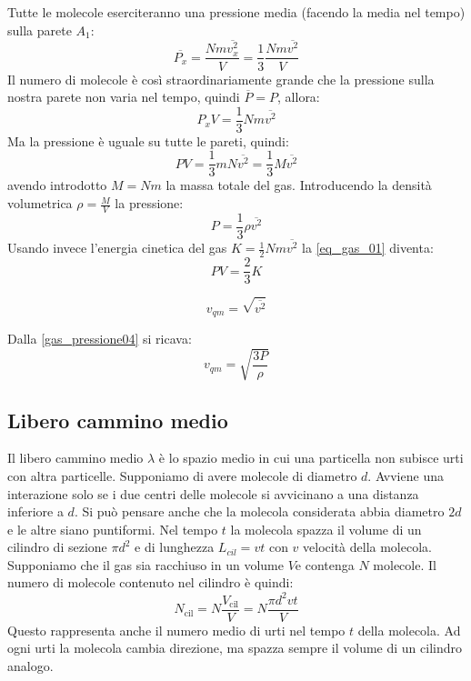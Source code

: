 Tutte le molecole eserciteranno una pressione media (facendo la media nel tempo) sulla parete $A_1$:
\begin{equation}
\overline{P_x}=\frac{Nm\overline{v_x^2}}{V}=\frac{1}{3}\frac{Nm\overline{v^2}}{V}
\end{equation}
Il numero di molecole è così straordinariamente grande che la pressione sulla nostra parete non varia nel tempo, quindi $\overline P=P$, allora:
\begin{equation*}P_x V=\frac{1}{3}Nm\overline{v^2}\end{equation*}
Ma la pressione è uguale su tutte le pareti, quindi:
\begin{equation}
PV=\frac{1}{3}mN\overline {v^2}=\frac{1}{3}M\overline{v^2}
\label{eq_gas_01}
\end{equation}
avendo introdotto $M=Nm$ la massa totale del gas. Introducendo la densità volumetrica $\rho=\frac{M}{V}$ la pressione:
\begin{equation}
P=\frac{1}{3}\rho\overline{v^2}
\label{gas_pressione04}
\end{equation}
Usando invece l'energia cinetica del gas $K=\frac{1}{2}Nm\overline{v^2}$ la \eqref{eq_gas_01} diventa:
\begin{equation}
PV=\frac{2}{3}K
\end{equation}
\begin{Def}
\begin{equation}
v_{qm}=\sqrt{\overline{v^2}}
\end{equation}
\end{Def}
Dalla \eqref{gas_pressione04} si ricava:
\begin{equation}
v_{qm}=\sqrt{\frac{3P}{\rho}}
\end{equation}
\subsection{Libero cammino medio}
\label{libero cammino medio fisica1}
Il libero cammino medio $\lambda$ è lo spazio medio in cui una particella non subisce urti con altra particelle. Supponiamo di avere molecole di diametro $d$. Avviene una interazione solo se i due centri delle molecole si avvicinano a una distanza inferiore a $d$. Si può pensare anche che la molecola considerata abbia diametro $2d$ e le altre siano puntiformi. Nel tempo $t$ la molecola spazza il volume di un cilindro di sezione $\pi d^2$ e di lunghezza $L_{cil}=vt$ con $v$ velocità della molecola. Supponiamo che il gas sia racchiuso in un volume $V$e contenga $N$ molecole. Il numero di molecole contenuto nel cilindro è quindi:
\begin{equation*}N_{\text{cil}}=N\frac{V_{\text{cil}}}{V}=N\frac{\pi d^2vt}{V}\end{equation*}
Questo rappresenta anche il numero medio di urti nel tempo $t$ della molecola. Ad ogni urti la molecola cambia direzione, ma spazza sempre il volume di un cilindro analogo.

